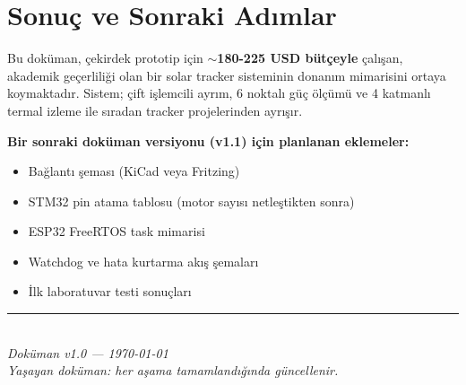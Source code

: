 \documentclass[11pt,a4paper]{article}
\begin{document}
\section{Sonuç ve Sonraki Adımlar}

Bu doküman, çekirdek prototip için \textbf{$\sim$180-225 USD bütçeyle} çalışan, akademik geçerliliği olan bir solar tracker sisteminin donanım mimarisini ortaya koymaktadır. Sistem; çift işlemcili ayrım, 6 noktalı güç ölçümü ve 4 katmanlı termal izleme ile sıradan tracker projelerinden ayrışır.

\textbf{Bir sonraki doküman versiyonu (v1.1) için planlanan eklemeler:}
\begin{itemize}
    \item Bağlantı şeması (KiCad veya Fritzing)
    \item STM32 pin atama tablosu (motor sayısı netleştikten sonra)
    \item ESP32 FreeRTOS task mimarisi
    \item Watchdog ve hata kurtarma akış şemaları
    \item İlk laboratuvar testi sonuçları
\end{itemize}

\vfill

\begin{center}
\rule{0.6\textwidth}{0.5pt}\\[0.3cm]
\textit{Doküman v1.0 --- \today}\\
\textit{Yaşayan doküman: her aşama tamamlandığında güncellenir.}
\end{center}
\end{document}
